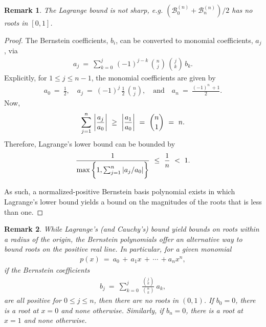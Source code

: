 \documentclass{article}
\newtheorem{remark}{Remark}
\begin{document}
\begin{remark}
The Lagrange bound is not sharp, e.g. $ (\mathcal{B}_0^{(n)} + \mathcal{B}_n^{(n)})/2$ has no roots in $[0, 1]$.
\end{remark}
\begin{proof}
The Bernstein coefficients, $b_i$, can be converted to monomial coefficients, $a_j$, via
\begin{eqnarray}
    a_j\ =\ \sum_{k=0}^j\, (-1)^{j-k}\, \binom{n}{j}\, \binom{j}{k}\, b_k. 
\end{eqnarray}
Explicitly, for $1\leq j\leq n-1$, the monomial coefficients are given by
\begin{align}
    a_0\ =\ \frac{1}{2}, \quad  a_j\ =\ (-1)^j\, \frac{1}{2}\, \binom{n}{j}, \quad\text{and}\quad a_n\ =\ \frac{(-1)^{n}\ + 1}{2}. 
\end{align}
Now,
\begin{align}
    \sum_{j=1}^n\, \bigg{|}\frac{a_j}{a_0}\bigg{|}\ \geq\ \bigg{|}\frac{a_1}{a_0}\bigg{|}\ =\ \binom{n}{1}\ =\ n.
\end{align}
Therefore, Lagrange's lower bound can be bounded by
\begin{align}
    \frac{1}{\max\bigg{\{}1, \sum_{j=1}^n |a_j/a_0|\bigg{\}}}\ \leq\ \frac{1}{n}\ <\ 1.
\end{align}

As such, a normalized-positive Bernstein basis polynomial exists in which Lagrange's lower bound yields a bound on the magnitudes of the roots that is less than one.
\end{proof}

\begin{remark}
While Lagrange's (and Cauchy's) bound yield bounds on roots within a radius of the origin, the Bernstein polynomials offer an alternative way to bound roots on the positive real line. In particular, for a given monomial
\begin{eqnarray}
    p(x)\ =\ a_0\, +\, a_1x\, +\, \cdots \, + a_nx^n,
\end{eqnarray}
if the Bernstein coefficients
\begin{eqnarray}\label{eq:monomials_to_bernstein_coef}
    b_j\ =\ \sum_{k=0}^j\ \frac{\binom{j}{k}}{\binom{n}{k}}\ a_k,
\end{eqnarray}
are all positive for $0\leq j\leq n$, then there are no roots in $(0, 1)$. If $b_0=0$, there is a root at $x=0$ and none otherwise. Similarly, if $b_n=0$, there is a root at $x=1$ and none otherwise.
\end{remark}
\end{document}
